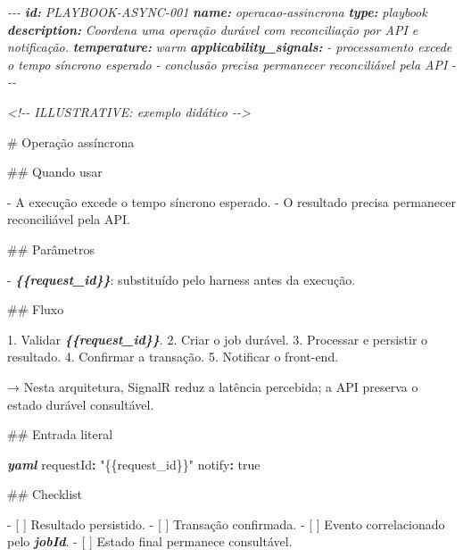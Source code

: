 \documentclass[
  10pt,
  a4paper,
  oneside]{book}
\newenvironment{Shaded}{}{}
\newcommand{\AnnotationTok}[1]{\textcolor[rgb]{0.38,0.63,0.69}{\textbf{\textit{#1}}}}
\newcommand{\AttributeTok}[1]{\textcolor[rgb]{0.49,0.56,0.16}{#1}}
\newcommand{\CharTok}[1]{\textcolor[rgb]{0.25,0.44,0.63}{#1}}
\newcommand{\CommentTok}[1]{\textcolor[rgb]{0.38,0.63,0.69}{\textit{#1}}}
\newcommand{\FunctionTok}[1]{\textcolor[rgb]{0.02,0.16,0.49}{#1}}
\newcommand{\InformationTok}[1]{\textcolor[rgb]{0.38,0.63,0.69}{\textbf{\textit{#1}}}}
\newcommand{\KeywordTok}[1]{\textcolor[rgb]{0.00,0.44,0.13}{\textbf{#1}}}
\newcommand{\NormalTok}[1]{#1}
\newcommand{\SpecialStringTok}[1]{\textcolor[rgb]{0.73,0.40,0.53}{#1}}
\newcommand{\StringTok}[1]{\textcolor[rgb]{0.25,0.44,0.63}{#1}}
\newcommand{\VariableTok}[1]{\textcolor[rgb]{0.10,0.09,0.49}{#1}}
\renewenvironment{Shaded}{\begin{snugshade}}{\end{snugshade}}%
\begin{document}
\begin{Shaded}
\begin{Highlighting}[]
\CommentTok{{-}{-}{-}}
\AnnotationTok{id:}\CommentTok{ PLAYBOOK{-}ASYNC{-}001}
\AnnotationTok{name:}\CommentTok{ operacao{-}assincrona}
\AnnotationTok{type:}\CommentTok{ playbook}
\AnnotationTok{description:}\CommentTok{ Coordena uma operação durável com reconciliação por API e notificação.}
\AnnotationTok{temperature:}\CommentTok{ warm}
\AnnotationTok{applicability\_signals:}
\CommentTok{  {-} processamento excede o tempo síncrono esperado}
\CommentTok{  {-} conclusão precisa permanecer reconciliável pela API}
\CommentTok{{-}{-}{-}}

\CommentTok{\textless{}!{-}{-} ILLUSTRATIVE: exemplo didático {-}{-}\textgreater{}}

\FunctionTok{\# Operação assíncrona}

\FunctionTok{\#\# Quando usar}

\SpecialStringTok{{-} }\NormalTok{A execução excede o tempo síncrono esperado.}
\SpecialStringTok{{-} }\NormalTok{O resultado precisa permanecer reconciliável pela API.}

\FunctionTok{\#\# Parâmetros}

\SpecialStringTok{{-} }\InformationTok{\textasciigrave{}\{\{request\_id\}\}\textasciigrave{}}\NormalTok{: substituído pelo harness antes da execução.}

\FunctionTok{\#\# Fluxo}

\SpecialStringTok{1. }\NormalTok{Validar }\InformationTok{\textasciigrave{}\{\{request\_id\}\}\textasciigrave{}}\NormalTok{.}
\SpecialStringTok{2. }\NormalTok{Criar o job durável.}
\SpecialStringTok{3. }\NormalTok{Processar e persistir o resultado.}
\SpecialStringTok{4. }\NormalTok{Confirmar a transação.}
\SpecialStringTok{5. }\NormalTok{Notificar o front{-}end.}

\NormalTok{→ Nesta arquitetura, SignalR reduz a latência percebida; a API preserva o estado durável consultável.}

\FunctionTok{\#\# Entrada literal}

\InformationTok{\textasciigrave{}\textasciigrave{}\textasciigrave{}yaml}
\FunctionTok{requestId}\KeywordTok{:}\AttributeTok{ }\StringTok{"\{\{request\_id\}\}"}
\FunctionTok{notify}\KeywordTok{:}\AttributeTok{ }\CharTok{true}
\InformationTok{\textasciigrave{}\textasciigrave{}\textasciigrave{}}

\FunctionTok{\#\# Checklist}

\SpecialStringTok{{-} }\VariableTok{[ ]}\NormalTok{ Resultado persistido.}
\SpecialStringTok{{-} }\VariableTok{[ ]}\NormalTok{ Transação confirmada.}
\SpecialStringTok{{-} }\VariableTok{[ ]}\NormalTok{ Evento correlacionado pelo }\InformationTok{\textasciigrave{}jobId\textasciigrave{}}\NormalTok{.}
\SpecialStringTok{{-} }\VariableTok{[ ]}\NormalTok{ Estado final permanece consultável.}
\end{Highlighting}
\end{Shaded}
\end{document}
